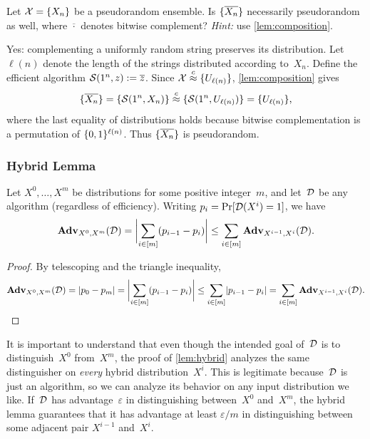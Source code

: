 \documentclass[11pt]{article}
\begin{document}
\begin{question}
  Let $\calX=\set{X_n}$ be a pseudorandom ensemble.
  Is $\set{\overline{X_n}}$ necessarily pseudorandom as well, where $\overline{\cdot}$ denotes bitwise complement?
  \emph{Hint:} use \cref{lem:composition}.
\end{question}

\begin{answer}
  Yes: complementing a uniformly random string preserves its distribution.
  Let $\ell(n)$ denote the length of the strings distributed according to~$X_n$.
  Define the efficient algorithm $\Sim(1^n,z):=\overline{z}$.
  Since $\calX\compind\set{U_{\ell(n)}}$, \cref{lem:composition} gives
  \[
    \set{\overline{X_n}}
    =\set{\Sim(1^n,X_n)}
    \compind\set{\Sim(1^n,U_{\ell(n)})}
    =\set{U_{\ell(n)}}\text,
  \]
  where the last equality of distributions holds because bitwise complementation is a permutation of $\bit^{\ell(n)}$.
  Thus $\set{\overline{X_n}}$ is pseudorandom.
\end{answer}

\subsubsection{Hybrid Lemma}

\begin{lemma}
  \label{lem:hybrid}
  Let $X^0,\ldots,X^m$ be distributions for some positive integer~$m$, and let~$\Dist$ be any algorithm (regardless of efficiency).
  Writing $p_i=\Pr[\Dist(X^i)=1]$, we have
  \[
    \advan_{X^0,X^m}(\Dist)
    =\abs[\bigg]{\sum_{i\in[m]}\parens{p_{i-1}-p_i}}
    \leq\sum_{i\in[m]}\advan_{X^{i-1},X^i}(\Dist)\text.
  \]
\end{lemma}

\begin{proof}
  By telescoping and the triangle inequality,
  \[
    \advan_{X^0,X^m}(\Dist)=\abs{p_0-p_m}=\abs[\bigg]{\sum_{i\in[m]}\parens{p_{i-1}-p_i}}\leq\sum_{i\in[m]}\abs{p_{i-1}-p_i}=\sum_{i\in[m]}\advan_{X^{i-1},X^i}(\Dist)\text.
  \]
\end{proof}

It is important to understand that even though the intended goal of~$\Dist$ is to distinguish~$X^0$ from~$X^m$, the proof of \cref{lem:hybrid} analyzes the same distinguisher on \emph{every} hybrid distribution~$X^i$.
This is legitimate because~$\Dist$ is just an algorithm, so we can analyze its behavior on any input distribution we like.
If~$\Dist$ has advantage~$\varepsilon$ in distinguishing between~$X^0$ and~$X^m$, the hybrid lemma guarantees that it has advantage at least $\varepsilon/m$ in distinguishing between some adjacent pair $X^{i-1}$ and~$X^i$.
\end{document}
